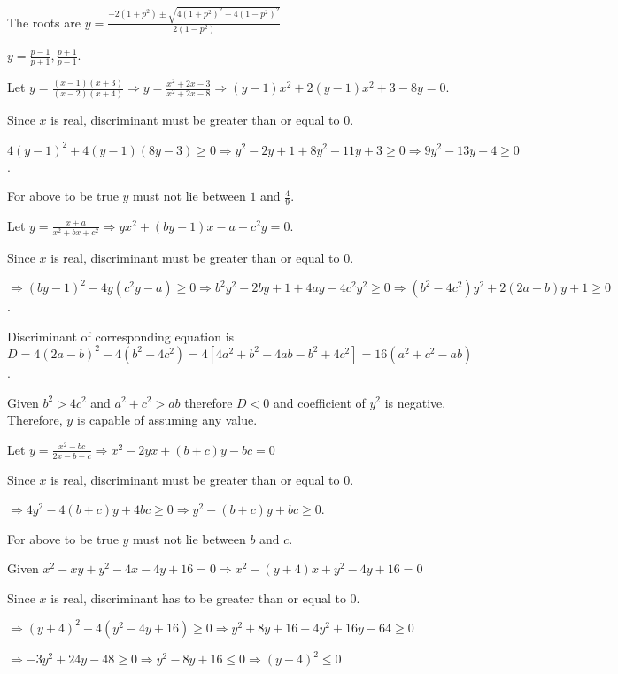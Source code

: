   The roots are $y = \frac{-2(1 + p^2) \pm \sqrt{4(1 + p^2)^2 - 4(1 - p^2)^2}}{2(1 - p^2)}$

  $y = \frac{p - 1}{p + 1}, \frac{p + 1}{p - 1}$.
\item Let $y = \frac{(x - 1)(x + 3)}{(x - 2)(x + 4)}\Rightarrow y = \frac{x^2 + 2x - 3}{x^2 + 2x -
  8}\Rightarrow (y - 1)x^2 + 2(y - 1)x^2 + 3 - 8y = 0$.

  Since $x$ is real, discriminant must be greater than or equal to $0$.

  $4(y - 1)^2 + 4(y - 1)(8y - 3) \ge 0\Rightarrow y^2 - 2y + 1 + 8y^2 - 11y + 3 \ge 0\Rightarrow 9y^2 - 13y
  + 4 \ge 0$.

  For above to be true $y$ must not lie between $1$ and $\frac{4}{9}$.
\item Let $y = \frac{x + a}{x^2 + bx + c^2}\Rightarrow yx^2 + (by - 1)x - a + c^2y = 0$.

  Since $x$ is real, discriminant must be greater than or equal to $0$.

  $\Rightarrow (by - 1)^2 - 4y(c^2y - a) \ge 0\Rightarrow b^2y^2 - 2by + 1 + 4ay - 4c^2y^2 \ge 0\Rightarrow
  (b^2 - 4c^2)y^2 + 2(2a - b)y + 1 \ge 0$.

  Discriminant of corresponding equation is $D = 4(2a - b)^2 - 4(b^2 - 4c^2) = 4[4a^2 + b^2 - 4ab - b^2 +
    4c^2] = 16(a^2 + c^2 - ab)$.

  Given $b^2 > 4c^2$ and $a^2 + c^2 > ab$ therefore $D < 0$ and coefficient of $y^2$ is negative.
  Therefore, $y$ is capable of assuming any value.
\item Let $y = \frac{x^2 - bc}{2x - b - c}\Rightarrow x^2 - 2yx + (b + c)y - bc = 0$

  Since $x$ is real, discriminant must be greater than or equal to $0$.

  $\Rightarrow 4y^2 - 4(b + c)y + 4bc \ge 0\Rightarrow y^2 - (b + c)y + bc \ge 0$.

  For above to be true $y$ must not lie between $b$ and $c$.
\item Given $x^2 - xy + y^2 - 4x - 4y + 16 = 0\Rightarrow x^2 - (y + 4)x + y^2 - 4y + 16 = 0$

  Since $x$ is real, discriminant has to be greater than or equal to $0$.

  $\Rightarrow (y + 4)^2 - 4(y^2 - 4y + 16) \ge 0\Rightarrow y^2 + 8y + 16 - 4y^2 + 16y - 64 \ge 0$

  $\Rightarrow -3y^2 + 24y - 48 \ge 0\Rightarrow y^2 - 8y + 16 \le 0\Rightarrow (y - 4)^2 \le 0$

